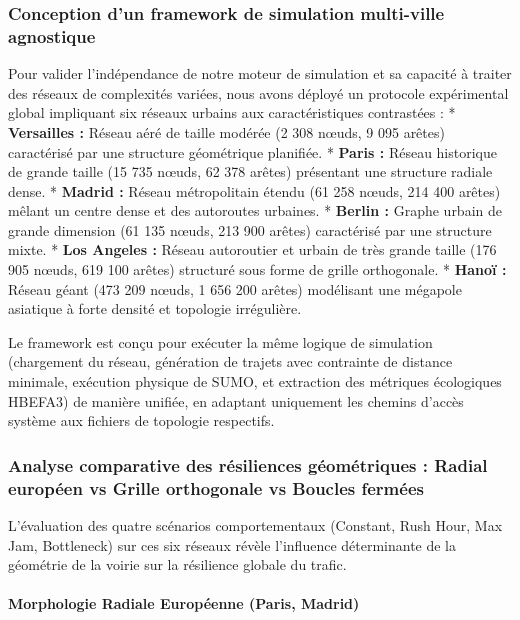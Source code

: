 \documentclass[10pt, a4paper]{article}
\begin{document}
\subsubsection{Conception d'un framework de simulation multi-ville
agnostique}\label{conception-dun-framework-de-simulation-multi-ville-agnostique}

Pour valider l'indépendance de notre moteur de simulation et sa capacité
à traiter des réseaux de complexités variées, nous avons déployé un
protocole expérimental global impliquant six réseaux urbains aux
caractéristiques contrastées : * \textbf{Versailles :} Réseau aéré de
taille modérée (2 308 nœuds, 9 095 arêtes) caractérisé par une structure
géométrique planifiée. * \textbf{Paris :} Réseau historique de grande
taille (15 735 nœuds, 62 378 arêtes) présentant une structure radiale
dense. * \textbf{Madrid :} Réseau métropolitain étendu (61 258 nœuds,
214 400 arêtes) mêlant un centre dense et des autoroutes urbaines. *
\textbf{Berlin :} Graphe urbain de grande dimension (61 135 nœuds, 213
900 arêtes) caractérisé par une structure mixte. * \textbf{Los Angeles
:} Réseau autoroutier et urbain de très grande taille (176 905 nœuds,
619 100 arêtes) structuré sous forme de grille orthogonale. *
\textbf{Hanoï :} Réseau géant (473 209 nœuds, 1 656 200 arêtes)
modélisant une mégapole asiatique à forte densité et topologie
irrégulière.

Le framework est conçu pour exécuter la même logique de simulation
(chargement du réseau, génération de trajets avec contrainte de distance
minimale, exécution physique de SUMO, et extraction des métriques
écologiques HBEFA3) de manière unifiée, en adaptant uniquement les
chemins d'accès système aux fichiers de topologie respectifs.

\subsubsection{Analyse comparative des résiliences géométriques : Radial
européen vs Grille orthogonale vs Boucles
fermées}\label{analyse-comparative-des-ruxe9siliences-guxe9omuxe9triques-radial-europuxe9en-vs-grille-orthogonale-vs-boucles-fermuxe9es}

L'évaluation des quatre scénarios comportementaux (Constant, Rush Hour,
Max Jam, Bottleneck) sur ces six réseaux révèle l'influence déterminante
de la géométrie de la voirie sur la résilience globale du trafic.

\paragraph{Morphologie Radiale Européenne (Paris,
Madrid)}\label{morphologie-radiale-europuxe9enne-paris-madrid}
\end{document}
